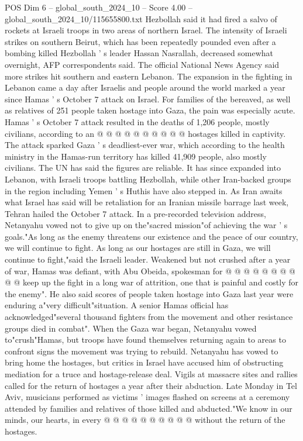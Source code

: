 \begin{textsample}{POS Dim 6 – global\_south\_2024\_10 – Score 4.00 – global\_south\_2024\_10/115655800.txt}
Hezbollah said it had fired a salvo of rockets at Israeli troops in two areas of northern Israel.
The intensity of Israeli strikes on southern Beirut, which has been repeatedly pounded even after a bombing killed Hezbollah ' s leader Hassan Nasrallah, decreased somewhat overnight, AFP correspondents said.
The official National News Agency said more strikes hit southern and eastern Lebanon.
The expansion in the fighting in Lebanon came a day after Israelis and people around the world marked a year since Hamas ' s October 7 attack on Israel.
For families of the bereaved, as well as relatives of 251 people taken hostage into Gaza, the pain was especially acute.
Hamas ' s October 7 attack resulted in the deaths of 1,206 people, mostly civilians, according to an @ @ @ @ @ @ @ @ @ @ hostages killed in captivity.
The attack sparked Gaza ' s deadliest-ever war, which according to the health ministry in the Hamas-run territory has killed 41,909 people, also mostly civilians.
The UN has said the figures are reliable.
It has since expanded into Lebanon, with Israeli troops battling Hezbollah, while other Iran-backed groups in the region including Yemen ' s Huthis have also stepped in.
As Iran awaits what Israel has said will be retaliation for an Iranian missile barrage last week, Tehran hailed the October 7 attack.
In a pre-recorded television address, Netanyahu vowed not to give up on the"sacred mission"of achieving the war ' s goals."As long as the enemy threatens our existence and the peace of our country, we will continue to fight.
As long as our hostages are still in Gaza, we will continue to fight,"said the Israeli leader.
Weakened but not crushed after a year of war, Hamas was defiant, with Abu Obeida, spokesman for @ @ @ @ @ @ @ @ @ @ keep up the fight in a long war of attrition, one that is painful and costly for the enemy".
He also said scores of people taken hostage into Gaza last year were enduring a"very difficult"situation.
A senior Hamas official has acknowledged"several thousand fighters from the movement and other resistance groups died in combat".
When the Gaza war began, Netanyahu vowed to"crush"Hamas, but troops have found themselves returning again to areas to confront signs the movement was trying to rebuild.
Netanyahu has vowed to bring home the hostages, but critics in Israel have accused him of obstructing mediation for a truce and hostage-release deal.
Vigils at massacre sites and rallies called for the return of hostages a year after their abduction.
Late Monday in Tel Aviv, musicians performed as victims ' images flashed on screens at a ceremony attended by families and relatives of those killed and abducted."We know in our minds, our hearts, in every @ @ @ @ @ @ @ @ @ @ without the return of the hostages.

\end{textsample}
